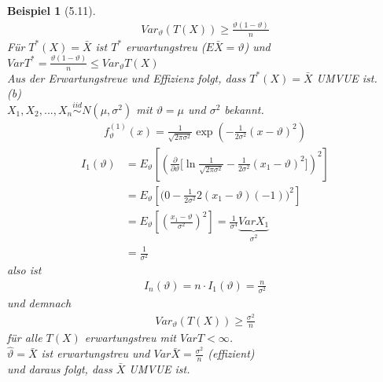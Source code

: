 \documentclass[a4paper,openany]{book}
\theoremstyle{mytheoremstyle}
\newtheorem*{bei}{Beispiel}
\theoremstyle{mytheoremstyle2}
\begin{document}
\begin{bei}[5.11]
  \begin{align*}
    Var _{\vartheta }(T(X))\geq \frac{\vartheta (1-\vartheta )}{n}
  \end{align*}
  Für $T^*(X)=\bar{X}$ ist $T^*$ erwartungstreu ($E \bar{X}=\vartheta $) und 
  $Var T^*=\frac{\vartheta (1-\vartheta )}{n}\leq Var _{\vartheta }T(X)$ \\
  Aus der Erwartungstreue und Effizienz folgt, dass $T^*(X)=\bar{X}$ UMVUE ist.  \\
  (b)\\
  $X_1,X_2,...,X_n \overset{iid}\sim N(\mu ,\sigma ^2)$ mit $\vartheta =\mu $ und $\sigma ^2$ bekannt.   
  \begin{align*}
    f _{\vartheta }^{(1)}(x)=\frac{1}{\sqrt{2 \pi \sigma ^2}}\exp \left(-\frac{1}{2 \sigma ^2}(x-\vartheta )^2\right)
  \end{align*}
  \begin{align*}
    I_1(\vartheta )
    &=E _{\vartheta }\left[\left(\frac{\partial }{\partial \vartheta }\bigg[\ln \frac{1}{\sqrt{2 \pi \sigma ^2}}-\frac{1}{2 \sigma ^2}(x_1-\vartheta )^2\bigg]\right)^2\right] \\
    &=E _{\vartheta } \left[\bigg(0-\frac{1}{2 \sigma ^2}2(x_1-\vartheta )(-1)\bigg)^2\right] \\
    &= E _{\vartheta }\left[\left(\frac{x_1-\vartheta }{\sigma ^2}\right)^2\right]=\frac{1}{\sigma ^4}\underbrace{Var X_1}_{\sigma ^2} \\
    &=\frac{1}{\sigma ^2}
  \end{align*}
  also ist 
  \begin{align*}
    I_n(\vartheta )=n \cdot I_1(\vartheta )=\frac{n}{\sigma ^2}
  \end{align*}
  und demnach 
  \begin{align*}
    Var _{\vartheta }(T(X))\geq \frac{\sigma ^2}{n}
  \end{align*}
  für alle $T(X)$ erwartungstreu mit $Var T < \infty $. \\
  $\hat{\vartheta }=\bar{X}$ ist erwartungstreu und $Var \bar{X}=\frac{\sigma ^2}{n}$ (effizient) \\
  und daraus folgt, dass $\bar{X}$ UMVUE ist.
\end{bei}
\end{document}
